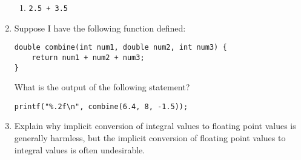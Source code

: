 \documentclass{article}
\begin{document}
\begin{enumerate}
\begin{enumerate}
\item
\begin{lstlisting}[style=CStyle]
2.5 + 3.5
\end{lstlisting}
\end{enumerate}

\item Suppose I have the following function defined:
\begin{lstlisting}[style=CStyle]
double combine(int num1, double num2, int num3) {
    return num1 + num2 + num3;
}
\end{lstlisting}

What is the output of the following statement?
\begin{lstlisting}[style=CStyle]
printf("%.2f\n", combine(6.4, 8, -1.5));
\end{lstlisting}

\item Explain why implicit conversion of integral values to floating point values is generally harmless, but the 
implicit conversion of floating point values to integral values is often undesirable.
\end{enumerate}
\end{document}
